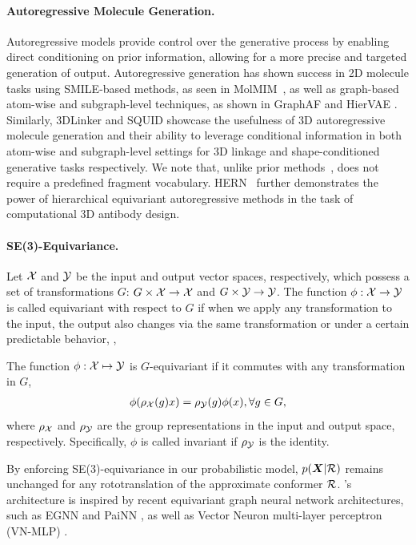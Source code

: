 \vspace{-1ex}
\paragraph{Autoregressive Molecule Generation.} Autoregressive models provide control over the generative process by enabling direct conditioning on prior information, allowing for a more precise and targeted generation of output.
Autoregressive generation has shown success in 2D molecule tasks using SMILE-based methods, as seen in MolMIM~\citep{reidenbach2023improving}, as well as graph-based atom-wise and subgraph-level techniques, as shown in GraphAF \citep{graphaf} and HierVAE \citep{HierVAE}.
Similarly, 3DLinker \citep{3dlinker} and SQUID \citep{squid} showcase the usefulness of 3D autoregressive molecule generation and their ability to leverage conditional information in both atom-wise and subgraph-level settings for 3D linkage and shape-conditioned generative tasks respectively. 
 We note that, unlike prior methods~\citep{squid}, \model does not require a predefined fragment vocabulary.
HERN~\citep{jin2022antibody} further demonstrates the power of hierarchical equivariant autoregressive methods in the task of computational 3D antibody design.

\vspace{-1ex}
\paragraph{SE(3)-Equivariance.} Let ${\mathcal{X}}$ and ${\mathcal{Y}}$ be the input and output vector spaces, respectively, which possess a set of transformations $G$: $G\times{\mathcal{X}}\rightarrow{\mathcal{X}}$ and $G\times{\mathcal{Y}}\rightarrow{\mathcal{Y}}$. The function $\phi: {\mathcal{X}}\rightarrow{\mathcal{Y}}$ is called equivariant with respect to $G$ if when we apply any transformation to the input, the output also changes via the same transformation or under a certain predictable behavior, \ie,
\begin{definition}
The function $\phi: {\mathcal{X}}\mapsto{\mathcal{Y}}$ is $G$-equivariant if it commutes with any transformation in $G$,
\begin{eqnarray}
\label{eq:equ}
\phi (\rho_{{\mathcal{X}}}(g)x) = \rho_{{\mathcal{Y}}}(g)\phi(x), \forall g\in G,
\end{eqnarray}
where $\rho_{{\mathcal{X}}}$ and $\rho_{{\mathcal{Y}}}$ are the group representations in the input and output space, respectively. Specifically, $\phi$ is called invariant if $\rho_{\mathcal{Y}}$ is the identity.
\end{definition}
By enforcing SE(3)-equivariance in our probabilistic model,  $p({\bm{X}} | {\mathcal{R}})$ remains unchanged for any rototranslation of the approximate conformer ${\mathcal{R}}$.
\modelns's architecture is inspired by recent equivariant graph neural network architectures, such as EGNN \citep{EGNN} and PaiNN \citep{painn}, as well as Vector Neuron multi-layer perceptron (VN-MLP) \citep{vn-mlp}.
\vspace{-2ex}